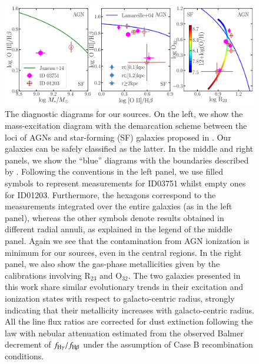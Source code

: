 \begin{figure}
    \includegraphics[width=\textwidth]{fig/bluediagram_updated.pdf}
    \caption[The diagnostic diagrams for our sources.]{The diagnostic diagrams for our sources.
    On the left, we show the mass-excitation diagram with the demarcation scheme between the loci of AGNs and 
    star-forming (SF) galaxies proposed in \citet{Juneau:2014ca}. Our galaxies can be safely classified as the 
    latter.
    In the middle and right panels, we show the ``blue'' diagrams with the boundaries described by \citet{Lamareille:2004jk}.
    Following the conventions in the left panel, we use filled symbols to represent measurements for ID03751 
    whilst empty ones for ID01203.
    Furthermore, the hexagons correspond to the measurements integrated over the entire galaxies (as in the left 
    panel), whereas the other symbols denote results obtained in different radial annuli, as explained in the 
    legend of the middle panel.
    Again we see that the contamination from AGN ionization is minimum for our sources, even in the central 
    regions.
    In the right panel,
    we also show the gas-phase metallicities given by the \citet{2008A&A...488..463M} calibrations involving 
    R$_{23}$ and O$_{32}$.
    The two galaxies presented in this work share similar evolutionary trends in their excitation and ionization 
    states with respect to galacto-centric radius, strongly indicating that their metallicity increases with 
    galacto-centric radius.
    All the line flux ratios are corrected for dust extinction following the \citet{1989ApJ...345..245C} law with 
    nebular attenuation estimated from the observed Balmer decrement of $f_{\textrm{H}\gamma}/f_{\textrm{H}\beta}$ under the assumption of 
    Case B recombination conditions.
    \label{fig:bluediagram}}
\end{figure}

